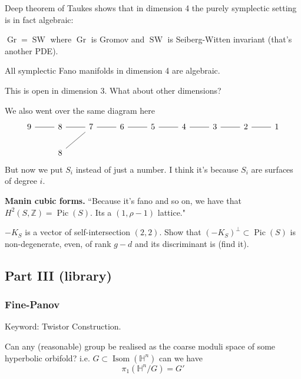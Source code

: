 Deep theorem of Taukes shows that in dimension 4 the purely symplectic setting is in fact algebraic:

\begin{thm}[Taukes]\leavevmode
$\operatorname{Gr}=\operatorname{SW}$ where $\operatorname{Gr}$ is Gromov and $\operatorname{SW}$ is Seiberg-Witten invariant (that's another PDE).
\end{thm}

\begin{coro}\leavevmode
	All symplectic Fano manifolds in dimension 4 are algebraic.
\end{coro}

This is open in dimension 3. What about other dimensions?

We also went over the same diagram here
\[\begin{tikzcd}
				9\arrow[r,no head]&8\arrow[r,no head]&7\arrow[ld,no head]\arrow[r,no head]&6\arrow[r,no head]&5\arrow[r,no head]&4\arrow[r,no head]&3\arrow[r,no head]&2\arrow[r,no head]&1\\
				&8
			\end{tikzcd}\]
But now we put $S_i$ instead of just a number. I think it's because  $S_i$ are surfaces of degree $i$.

{\bfseries Manin cubic forms.}\hspace{.5em} “Because it's fano and so on, we have that $H^{2}(S,\mathbb{Z})=\operatorname{Pic}(S)$. Its a $(1,\rho-1)$ lattice."

\begin{exercise}\leavevmode
	$-K_S$ is a vector of self-intersection  $(2,2)$. Show that $(-K_S)^\perp \subset \operatorname{Pic}(S)$ is non-degenerate, even, of rank $g-d$ and its discriminant is (find it).
\end{exercise}

\subsection{Part III (library)}
\subsubsection{Fine-Panov}
Keyword: Twistor Construction.

\begin{question}[Gromov]\leavevmode
	Can any (reasonable) group be realised as the coarse moduli space of some hyperbolic orbifold? i.e. $G\subset\operatorname{I som}(\mathbb{H}^n)$ can we have
	\[\pi_{1}(\mathbb{H}^n/G)=G'\]
\end{question}

